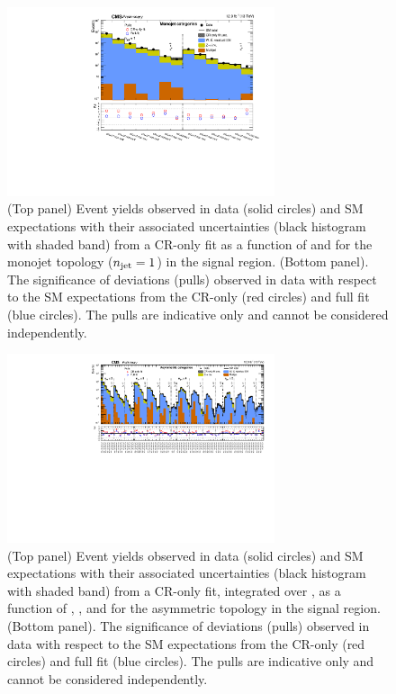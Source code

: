 \begin{figure}[!h]
  \begin{center}
    \includegraphics[width=0.7\textwidth]{summaryPlot_Monojet_prefit_overlay_fit_b}
    \caption{(Top panel) Event yields observed in data (solid circles)
      and SM expectations with their associated uncertainties (black
      histogram with shaded band) from a CR-only fit as a function of
      \nb and \scalht for the monojet topology ($n_{\text{jet}} = 1$) in the
      signal region. (Bottom panel). The significance of deviations
      (pulls) observed in data with respect to the SM expectations
      from the CR-only (red circles) and full fit (blue circles). The
      pulls are indicative only and cannot be considered
      independently.}
    \label{fig:mono}
  \end{center}
\end{figure}

\begin{figure}[!h]
  \begin{center}
    \includegraphics[angle=90,width=0.7\textwidth]{summaryPlot_Asymmetric_prefit_overlay_fit_b}
    \caption{(Top panel) Event yields observed in data (solid circles)
      and SM expectations with their associated uncertainties (black
      histogram with shaded band) from a CR-only fit, integrated over
      \HTmiss, as a function of \njet, \nb, and \scalht for the
      asymmetric topology in the signal region. (Bottom panel). The
      significance of deviations (pulls) observed in data with respect
      to the SM expectations from the CR-only (red circles) and full
      fit (blue circles). The pulls are indicative only and cannot be
      considered independently.}
    \label{fig:asym}
  \end{center}
\end{figure}

